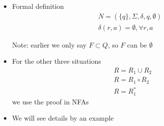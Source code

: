 \begin{frame}[allowframebreaks]
\begin{itemize}
\item [] Formal definition
\begin{gather*}
  N=(\{q\}, \Sigma, \delta, q, \emptyset)\\
\delta(r,a)=\emptyset, \forall r, a
\end{gather*}

Note: earlier we only say $F \subset Q$,
so $F$ can be $\emptyset$

\item For the other three situations
  \begin{equation*}
    \begin{split}
& R=R_1\cup R_2\\
& R=R_1 \circ R_2\\
& R=R_1^*
\end{split}
\end{equation*}
we use the proof in NFAs
\item We will see details by an example
\end{itemize}\end{frame}


